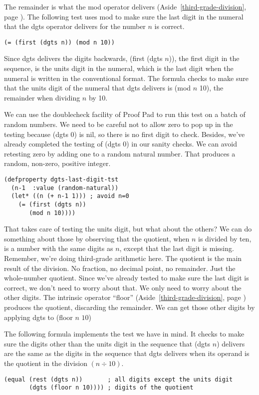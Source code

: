 The remainder is
what the mod operator delivers (Aside~\ref{third-grade-division}, page \pageref{third-grade-division}).
The following test uses mod to make sure the last digit in the numeral
that the dgts operator delivers for the number $n$ is correct.
\begin{Verbatim}
(= (first (dgts n)) (mod n 10))
\end{Verbatim}

Since dgts delivers the digits backwards,
(first (dgts $n$)), the first digit in the sequence,
is the units digit in the numeral, which is the last digit
when the numeral is written in the conventional format.
The formula checks to make sure that
the units digit of the numeral that dgts delivers is (mod $n$ 10),
the remainder when dividing $n$ by 10.

We can use the doublecheck facility of Proof Pad to run this test on a batch of random numbers.
We need to be careful not to allow zero to pop up in the testing
because (dgts 0) is nil, so there is no first digit to check.
Besides, we've already completed the testing of (dgts 0) in our sanity checks.
We can avoid retesting zero by adding one to a random natural number.
That produces a random, non-zero, positive integer.
\begin{Verbatim}
(defproperty dgts-last-digit-tst
  (n-1  :value (random-natural))
  (let* ((n (+ n-1 1))) ; avoid n=0
    (= (first (dgts n))
       (mod n 10))))
\end{Verbatim}

That takes care of testing the units digit, but what about the others?
We can do something about those by observing that the quotient,
when $n$ is divided by ten,
is a number with the same digits as $n$,
except that the last digit is missing.
Remember, we're doing third-grade arithmetic here.
The quotient is the main result of the division.
No fraction, no decimal point, no remainder. Just the whole-number quotient.
Since we've already tested to make sure the last digit is correct,
we don't need to worry about that.
We only need to worry about the other digits.
The intrinsic operator ``floor''
(Aside~\ref{third-grade-division}, page \pageref{third-grade-division})
produces the quotient, discarding the remainder.
We can get those other digits by applying dgts to (floor $n$ $10$)

The following formula implements the test we have in mind.
It checks to make sure the digits other than the units digit
in the sequence that (dgts $n$) delivers
are the same as the digits in the sequence that
dgts delivers when its operand is the quotient in
the division $(n \div 10)$.
\begin{Verbatim}
(equal (rest (dgts n))       ; all digits except the units digit
       (dgts (floor n 10)))) ; digits of the quotient
\end{Verbatim}

